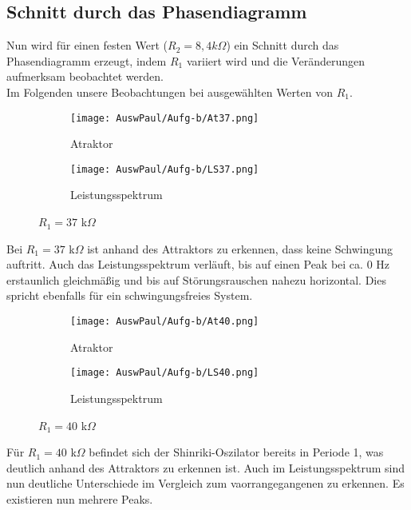 \subsection{Schnitt durch das Phasendiagramm}
Nun wird für einen festen Wert (\(R_2 = 8,4 k\Omega\)) ein Schnitt durch das Phasendiagramm erzeugt, indem \(R_1\) variiert wird und die Veränderungen aufmerksam beobachtet werden. \\
Im Folgenden unsere Beobachtungen bei ausgewählten Werten von \(R_1\).\\

\begin{figure}[h]
    \centering
    \begin{subfigure}[b]{0.45\textwidth}
        \centering
        \texttt{[image: AuswPaul/Aufg-b/At37.png]}
        \caption{Atraktor}
    \end{subfigure}
    \hfill
    \begin{subfigure}[b]{0.45\textwidth}
        \centering
        \texttt{[image: AuswPaul/Aufg-b/LS37.png]}
        \caption{Leistungsspektrum}
    \end{subfigure}
    \caption{$R_1 = 37$ k$\Omega$}
\end{figure}

Bei $R_1 = 37$ k$\Omega$ ist anhand des Attraktors zu erkennen, dass keine Schwingung auftritt. Auch das Leistungsspektrum verläuft, bis auf einen Peak bei ca. 0 Hz erstaunlich gleichmäßig und bis auf Störungsrauschen nahezu horizontal. Dies spricht ebenfalls für ein schwingungsfreies System.\\

\begin{figure}[h]
    \centering
    \begin{subfigure}[b]{0.45\textwidth}
        \centering
        \texttt{[image: AuswPaul/Aufg-b/At40.png]}
        \caption{Atraktor}
    \end{subfigure}
    \hfill
    \begin{subfigure}[b]{0.45\textwidth}
        \centering
        \texttt{[image: AuswPaul/Aufg-b/LS40.png]}
        \caption{Leistungsspektrum}
    \end{subfigure}
    \caption{$R_1 = 40$ k$\Omega$}
\end{figure}

Für $R_1 =40$ k$\Omega$ befindet sich der Shinriki-Oszilator bereits in Periode 1, was deutlich anhand des Attraktors zu erkennen ist. Auch im Leistungsspektrum sind nun deutliche Unterschiede im Vergleich zum vaorrangegangenen zu erkennen. Es existieren nun mehrere Peaks.

